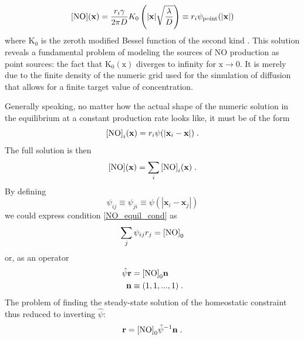 \documentclass[10pt,letterpaper]{article}
\begin{document}
\begin{equation}
{\rm [NO]}(\mathbf{x}) = \frac{r_i \gamma}{2 \pi D} K_0 \left(|\mathbf{x}|\sqrt{\frac{\lambda}{D}} \right) \equiv r_i  \psi_{\rm point}(|\mathbf{x}|)
\label{solution_diff_equil_bessel}
\end{equation}
where $\mathrm{K_0}$ is the zeroth modified Bessel function of the second kind \cite{Helmholtz_Solution_2d}.  This solution reveals a fundamental problem of modeling the sources of NO production as point sources: the fact that $\mathrm{K_0(x)}$ diverges to infinity for $\mathrm{x\rightarrow 0}$. It is merely due to the finite density of the numeric grid used for the simulation of diffusion that allows for a finite target value of concentration.

Generally speaking, no matter how the actual shape of the numeric solution in the equilibrium at a constant production rate looks like, it must be of the form
\begin{equation}
{\rm [NO]}_i(\mathbf{x}) = r_i  \psi (|\mathbf{x}_{i}-\mathbf{x}|) \;  . \label{general_diff_interaction}
\end{equation}
The full solution is then
\begin{equation}
{\rm [NO]}(\mathbf{x}) = \sum_i {\rm [NO]}_i(\mathbf{x})\;.
\label{full_sol_diff_equil}
\end{equation}
By defining
\begin{equation}
\psi_{ij} \equiv \psi_{ji} \equiv \psi (|\mathbf{x}_i-\mathbf{x}_j|)
\label{interact_matrix_elements}
\end{equation}
we could express condition \eqref{NO_equil_cond} as
\begin{equation}
\sum_j \psi_{ij} r_j = {\rm [NO]}_0
\label{NO_equil_cond_interact_matrix}
\end{equation}
or, as an operator
\begin{align}
\hat{\psi}\mathbf{r} &= {\rm [NO]}_0 \mathbf{n} \label{NO_equil_cond_interact_matrix_operator} \\
\mathbf{n}&\equiv (1,1,...,1) \; .
\end{align}
The problem of finding the steady-state solution of the homeostatic constraint thus reduced to inverting $\hat{\psi}$:
\begin{equation}
\mathbf{r} = {\rm [NO]}_0 \hat{\psi}^{-1} \mathbf{n} \; .
\label{NO_euqil_cond_interact_matrix_operator_solve}
\end{equation}
\end{document}
